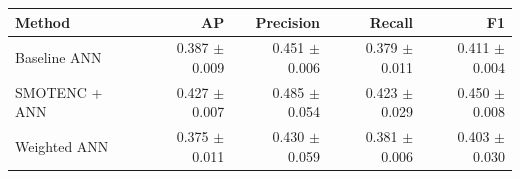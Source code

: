 \begin{tabular}{lrrrr}
\hline Method & AP & Precision & Recall & F1 \\
\hline
Baseline ANN & 0.387 $\pm$ 0.009 & 0.451 $\pm$ 0.006 & 0.379 $\pm$ 0.011 & 0.411 $\pm$ 0.004 \\
SMOTENC + ANN & 0.427 $\pm$ 0.007 & 0.485 $\pm$ 0.054 & 0.423 $\pm$ 0.029 & 0.450 $\pm$ 0.008 \\
Weighted ANN & 0.375 $\pm$ 0.011 & 0.430 $\pm$ 0.059 & 0.381 $\pm$ 0.006 & 0.403 $\pm$ 0.030 \\
\hline
\end{tabular}
